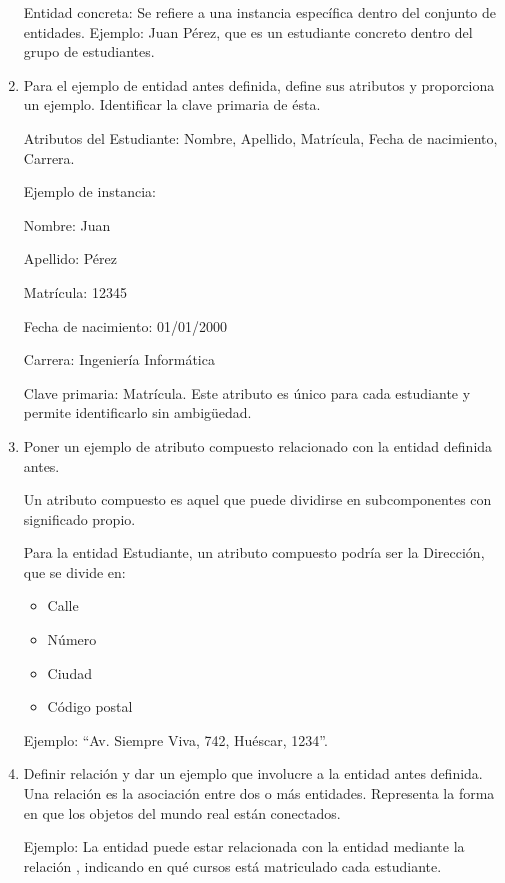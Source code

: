 \begin{enumerate}[label=\textbf{\arabic*.}, itemsep=0.5em]
        Entidad concreta: Se refiere a una instancia específica dentro del conjunto de entidades. Ejemplo: Juan Pérez, que es un estudiante concreto dentro del grupo de estudiantes.

    \item Para el ejemplo de entidad antes definida, define sus atributos y proporciona un ejemplo. Identificar la clave primaria de ésta.

        Atributos del Estudiante: Nombre, Apellido, Matrícula, Fecha de nacimiento, Carrera.

        Ejemplo de instancia:

            Nombre: Juan

            Apellido: Pérez

            Matrícula: 12345

            Fecha de nacimiento: 01/01/2000

            Carrera: Ingeniería Informática

        Clave primaria: Matrícula. Este atributo es único para cada estudiante y permite identificarlo sin ambigüedad.

    \item Poner un ejemplo de atributo compuesto relacionado con la entidad definida antes.

        Un atributo compuesto es aquel que puede dividirse en subcomponentes con significado propio.

        Para la entidad Estudiante, un atributo compuesto podría ser la Dirección, que se divide en:

            \begin{itemize}
                \item Calle
                \item Número
                \item Ciudad
                \item Código postal
            \end{itemize}

        Ejemplo: ``Av. Siempre Viva, 742, Huéscar, 1234''.
        \item Definir relación y dar un ejemplo que involucre a la entidad antes definida.  
        Una relación es la asociación entre dos o más entidades. Representa la forma en que los objetos del mundo real están conectados.  
        
        Ejemplo: La entidad  puede estar relacionada con la entidad  mediante la relación , indicando en qué cursos está matriculado cada estudiante.
        

\end{enumerate}

